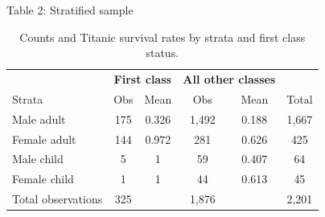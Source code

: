 \documentclass{beamer}
\begin{document}
\begin{frame}{Table 2: Stratified sample}

{\renewcommand{\arraystretch}{1.1}
\tabcolsep 		
\begin{table}\small{}
\caption{Counts and Titanic survival rates by strata and first class status.}
\centering
\begin{tabular}{lcc|cc|c}
\toprule
\multicolumn{1}{c}{\textbf{}}&
\multicolumn{2}{c}{\textbf{First class}}&
\multicolumn{2}{c}{\textbf{All other classes}}&
\multicolumn{1}{c}{\textbf{}}\\
\multicolumn{1}{l}{Strata}&
\multicolumn{1}{c}{Obs}&
\multicolumn{1}{c}{Mean}&
\multicolumn{1}{c}{Obs}&
\multicolumn{1}{c}{Mean}&
\multicolumn{1}{c}{Total}\\
\midrule
Male adult		& 175	& 0.326	& 1,492	& 0.188	& 1,667 \\
Female adult	& 144	& 0.972	& 281	& 0.626	& 425 \\
Male child		& 5		& 1		& 59		& 0.407 	& 64\\
Female child	& 1		& 1		& 44		& 0.613 	& 45\\
\midrule
Total	observations	& 325	&&	1,876	 && 2,201\\
\bottomrule
\end{tabular}
\label{tab:titanic-counts}
\end{table}}


\end{frame}
\end{document}
